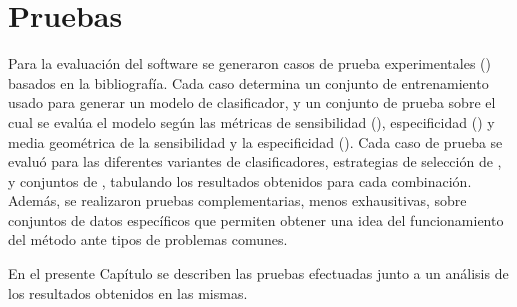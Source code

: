 %
%
%
%
\chapter{Pruebas}
%
Para la evaluación del software se generaron casos de prueba
experimentales () basados en la bibliografía.
Cada caso determina un conjunto de entrenamiento usado para generar un
modelo de clasificador, y un conjunto de prueba sobre el cual se
evalúa el modelo según las métricas de sensibilidad (\SE),
especificidad (\SP) y media geométrica de la sensibilidad y la
especificidad (\GM).
Cada caso de prueba se evaluó para las diferentes variantes de
clasificadores, estrategias de selección de , y conjuntos de
, tabulando los resultados obtenidos para cada combinación.
Además, se realizaron pruebas complementarias, menos exhausitivas,
sobre conjuntos de datos específicos que permiten obtener una idea del
funcionamiento del método ante tipos de problemas comunes.

En el presente Capítulo se describen las pruebas efectuadas junto a un
análisis de los resultados obtenidos en las mismas.
